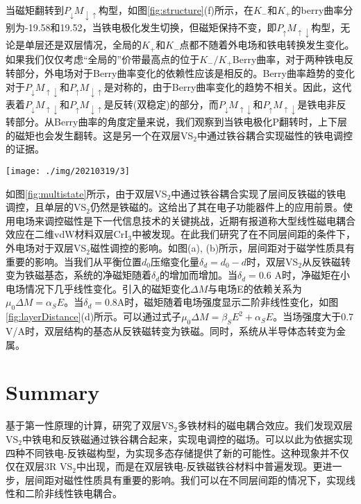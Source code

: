 \documentclass[reprint, aps, prb, showkeys]{revtex4-2}
\begin{document}
当磁矩翻转到$P_{\downarrow}M_{\downarrow\uparrow}$构型，如图\ref{fig:structure}(f)所示，在$K_-$和$K_+$的berry曲率分别为-19.58和19.52，当铁电极化发生切换，但磁矩保持不变，即$P_{\uparrow}M_{\uparrow\downarrow}$构型，无论是单层还是双层情况，全局的$K_+$和$K_-$点都不随着外电场和铁电转换发生变化。如果我们仅仅考虑“全局的”价带最高点的位于$K_-/K_+$Berry曲率，对于两种铁电反转部分，外电场对于Berry曲率变化的依赖性应该是相反的。Berry曲率趋势的变化对于$P_{\downarrow}M_{\uparrow\downarrow}$和$P_{\uparrow}M_{\downarrow\uparrow}$是对称的，由于Berry曲率变化的趋势不相关。因此，这代表着$P_{\downarrow}M_{\uparrow\downarrow}$和$P_{\uparrow}M_{\downarrow\uparrow}$是反转(双稳定)的部分，而$P_{\downarrow}M_{\uparrow\downarrow}$和$P_{\uparrow}M_{\uparrow\downarrow}$是铁电非反转部分。从Berry曲率的角度定量来说，我们观察到当铁电极化P翻转时，上下层的磁矩也会发生翻转。这是另一个在双层VS$_2$中通过铁谷耦合实现磁性的铁电调控的证据。

\begin{figure*}[t]
    \texttt{[image: ./img/20210319/3]}
    \caption{\label{fig:layerDistance} 
    双层VS$_2$总磁矩随着层间变化与外电场之间的的函数关系(不考虑SOC)。VS$_2$层间距离d的定义如(a)所示，即为两层V原子之间的距离。通过结构优化得到的层间平衡距离定义为$d_0$，$\delta_d$定义为层间距减小的值。
    }
\end{figure*}

如图\ref{fig:multistate}所示，由于双层VS$_2$中通过铁谷耦合实现了层间反铁磁的铁电调控，且单层的VS$_2$仍然是铁磁的。这给出了其在电子功能器件上的应用前景。使用电场来调控磁性是下一代信息技术的关键挑战，近期有报道称大型线性磁电耦合效应在二维vdW材料双层CrI$_3$中被发现。在此我们研究了在不同层间距的条件下，外电场对于双层VS$_2$磁性调控的影响。如图(a), (b)所示，层间距对于磁学性质具有重要的影响。当我们从平衡位置$d_0$压缩变化量$\delta_d = d_0 - d$时，双层VS$_2$从反铁磁转变为铁磁基态，系统的净磁矩随着$\delta_d$的增加而增加。当$\delta_d = 0.6$ A时，净磁矩在小电场情况下几乎线性变化。引入的磁矩变化$\Delta M$与电场E的依赖关系为$\mu_0 \Delta M = \alpha_S E$。当$\delta_d = 0.8$A时，磁矩随着电场强度显示二阶非线性变化，如图\ref{fig:layerDistance}(d)所示。可以通过式子$\mu_0 \Delta M = \beta_S E^2 + \alpha_S E$。当场强度大于0.7 V/A时，双层结构的基态从反铁磁转变为铁磁。同时，系统从半导体态转变为金属。

\section{Summary}
基于第一性原理的计算，研究了双层VS$_2$多铁材料的磁电耦合效应。我们发现双层VS$_2$中铁电和反铁磁通过铁谷耦合起来，实现电调控的磁场。可以以此为依据实现四种不同铁电-反铁磁构型，为实现多态存储提供了新的可能性。这种现象并不仅仅在双层3R VS$_2$中出现，而是在双层铁电-反铁磁铁谷材料中普遍发现。更进一步，层间距对磁性性质具有重要的影响。我们可以在不同层间距的情况下，实现线性和二阶非线性铁电耦合。
\end{document}
